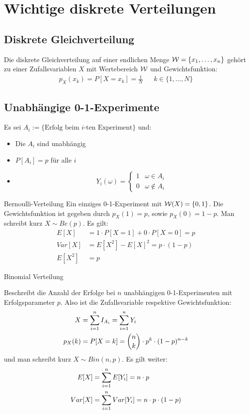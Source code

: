 \section{Wichtige diskrete Verteilungen}
\subsection{Diskrete Gleichverteilung}
Die diskrete Gleichverteilung auf einer endlichen Menge $\mathcal{W} = \{ x_1, \dots,
  x_n \}$ gehört zu einer Zufallsvariablen $X$ mit Wertebereich $\mathcal{W}$ und
Gewichtsfunktion:
\begin{align*}
  p_X (x_k) = P[X = x_k] = \frac{1}{N} &  & k \in \{1, \dots, N\}
\end{align*}
\subsection{Unabhängige 0-1-Experimente}
Es sei $A_i := \{\text{Erfolg beim $i$-ten Experiment}\}$ und:
\begin{itemize}
  \item Die $A_i$ sind unabhängig
  \item $P[A_i] = p$ für alle $i$
  \item \[
          Y_i (\omega) =
          \begin{cases}
            1 & \omega \in A_i      \\
            0 & \omega \not \in A_i
          \end{cases}
        \]
\end{itemize}
\begin{definition}{Bernoulli-Verteilung}
Ein einziges 0-1-Experiment mit $\mathcal{W} (X) = \{0, 1\}$. Die Gewichtsfunktion ist
gegeben durch $p_X (1) = p$, sowie $p_X (0) = 1-p$. Man schreibt kurz $X \sim
  Be (p)$. Es gilt:
\begin{align*}
  E[X]   & = 1 \cdot P[X = 1] + 0 \cdot P[X = 0] = p \\
  Var[X] & = E[X^2] - {E[X]}^2 = p \cdot  (1-p)\\
  E[X^2] & = p
\end{align*}
\end{definition}
\begin{definition}{Binomial Verteilung}

Beschreibt die Anzahl der Erfolge bei $n$ unabhängigen 0-1-Experimenten mit
Erfolgsparameter $p$. Also ist die Zufallsvariable respektive Gewichtsfunktion:
\begin{align*}
  X       & = \sum_{i = 1}^n I_{A_i} = \sum_{i = 1}^n Y_i                                \\
  p_X (k) & = P[X = k] = \binom{n}{k} \cdot p^k \cdot  (1-p)^{n-k}
\end{align*}
und man schreibt kurz $X \sim Bin (n, p)$. Es gilt weiter:
\begin{align*}
  E[X]   & = \sum_{i = 1}^n E[Y_i] = n \cdot p                \\
  Var[X] & = \sum_{i = 1}^n Var[Y_i] = n \cdot p \cdot  (1-p)\\
\end{align*}
\end{definition}
